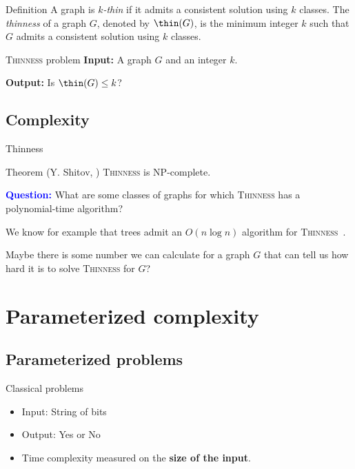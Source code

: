 \documentclass{beamer}
\begin{document}
\begin{frame}{Definition}
    A graph is \emph{$k$-thin} if it admits a consistent solution using $k$ classes.
    The \emph{thinness} of a graph $G$, denoted by $\thin(G)$, is the minimum integer $k$ such that $G$ admits a consistent solution using $k$ classes.
    \vspace{1em}
    \begin{block}{\textsc{Thinness} problem}
        \textbf{Input:} A graph $G$ and an integer $k$.

        \textbf{Output:} Is $\thin(G) \leq k$?
    \end{block}
\end{frame}


\subsection{Complexity}
\begin{frame}{Thinness}
    \begin{block}{Theorem (Y. Shitov, \cite{thinness-np-complete})}
        \textsc{Thinness} is NP-complete.
    \end{block}
    \pause
    \vspace{1em}
    \textbf{\textcolor{blue}{Question:}} What are some classes of graphs for which \textsc{Thinness} has a polynomial-time algorithm? 
    \pause 
    
    We know for example that trees admit an $O(n \log n)$ algorithm for \textsc{Thinness}~\cite{thinness-of-trees}.
    \pause

    Maybe there is some number we can calculate for a graph $G$ that can tell us how hard it is to solve \textsc{Thinness} for $G$?
\end{frame}

\section{Parameterized complexity}

\subsection{Parameterized problems}
\begin{frame}{Classical problems}
    \begin{itemize}
    \item Input: String of bits
    \item Output: Yes or No
    \item Time complexity measured on the \textbf{size of the input}.
    \end{itemize}
\end{frame}
\end{document}
